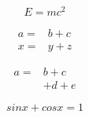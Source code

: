 
\begin{equation}
    E = mc^2
\end{equation}


\begin{align}
    a = {}& b + c\\
    x = {}& y + z
\end{align}


\begin{equation}
    \begin{split}
        a = {}& b + c\\
            {}& + d + e
    \end{split} 
\nonumber
\end{equation}
    
    
\begin{equation} 
sinx+cosx=1 
\end{equation}


